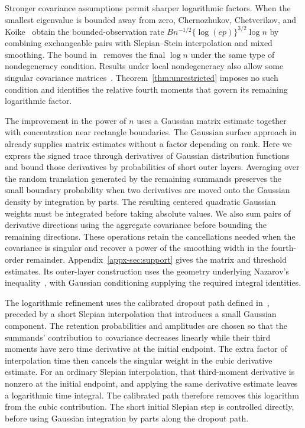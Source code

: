 \documentclass[11pt,letterpaper]{article}
\theoremstyle{remark}
\begin{document}
Stronger covariance assumptions permit sharper logarithmic factors.
When the smallest eigenvalue is bounded away from zero,
Chernozhukov, Chetverikov, and Koike~\cite{CCK} obtain the bounded-observation
rate \(Bn^{-1/2}\{\log(ep)\}^{3/2}\log n\) by combining exchangeable
pairs with Slepian--Stein interpolation and mixed smoothing.
The bound in~\cite{AL} removes the final \(\log n\) under the same
type of nondegeneracy condition. Results under local nondegeneracy
also allow some singular covariance matrices~\cite{FKLZ,Local}.
Theorem~\ref{thm:unrestricted} imposes no such condition and identifies
the relative fourth moments that govern its remaining logarithmic factor.

The improvement in the power of \(n\) uses a Gaussian matrix estimate
together with concentration near rectangle boundaries. The Gaussian
surface approach in~\cite{GaoZhang} already supplies matrix estimates
without a factor depending on rank. Here we express the signed trace
through derivatives of Gaussian distribution functions and bound those
derivatives by probabilities of short outer layers. Averaging over the
random translation generated by the remaining summands preserves the
small boundary probability when two derivatives are moved onto the
Gaussian density by integration by parts. The resulting centered
quadratic Gaussian weights must be integrated before taking absolute
values. We also sum pairs of derivative directions using the aggregate
covariance before bounding the remaining directions. These operations
retain the cancellations needed when the covariance is singular and
recover a power of the smoothing width in the fourth-order remainder.
Appendix~\ref{appx-sec:support} gives the matrix and threshold estimates.
Its outer-layer construction uses the geometry underlying Nazarov's
inequality~\cite{Nazarov2003,CCK17N}, with Gaussian conditioning supplying
the required integral identities.

The logarithmic refinement uses the calibrated dropout path defined
in~\cite[Section~4]{AL}, preceded by a short Slepian interpolation that
introduces a small Gaussian component. The retention probabilities
and amplitudes are chosen so that the summands' contribution to covariance
decreases linearly while their third moments have zero time derivative
at the initial endpoint. The extra factor of interpolation time then cancels the
singular weight in the cubic derivative estimate. For an ordinary
Slepian interpolation, that third-moment derivative is nonzero at the
initial endpoint, and applying the same derivative estimate leaves a
logarithmic time integral. The calibrated path therefore removes this
logarithm from the cubic contribution. The short initial Slepian step
is controlled directly, before using Gaussian integration by parts
along the dropout path.
\end{document}
